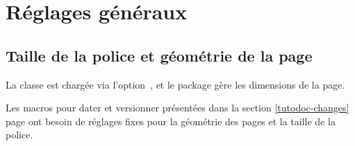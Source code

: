 \documentclass{main}
\begin{document}
\section{Réglages généraux}

\subsection{Taille de la police et géométrie de la page}

La classe  est chargée via l'option \,, et le package  gère les dimensions de la page.


\begin{tdocwarn}
	Les macros pour dater et versionner présentées dans la section \ref{tutodoc-changes} page \pageref{tutodoc-changes} ont besoin de réglages fixes pour la géométrie des pages et la taille de la police.
\end{tdocwarn}
\end{document}
